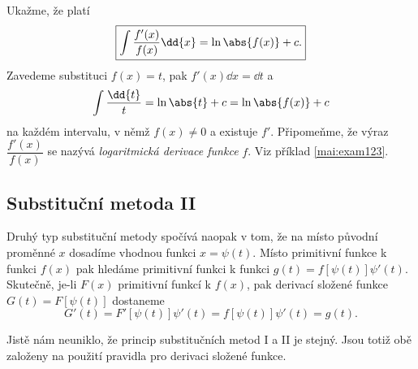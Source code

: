       

      

      

      

      Ukažme, že platí 
      \begin{equation}\label{mai:eq139}
        \boxed{\int{\dfrac{f'(x)}{f(x)}}\dd{x} = \ln\abs{f(x)} + c.}
      \end{equation}
      Zavedeme substituci \(f(x) =t\), pak \(f'(x)\dd{x} = \dd{t}\) a 
      \begin{equation*}
        \int{\dfrac{\dd{t}}{t}} = \ln\abs{t} + c = \ln\abs{f(x)} + c
      \end{equation*}
      na každém intervalu, v němž \(f(x)\neq 0\) a existuje \(f'\). Připomeňme, že výraz
      \(\dfrac{f'(x)}{f(x)}\) se nazývá \emph{logaritmická derivace funkce} \(f\). Viz příklad
      \ref{mai:exam123}.
   

    \newpage
    \subsection{Substituční metoda II}
      Druhý typ substituční metody spočívá naopak v tom, že na místo původní proměnné \(x\) 
      dosadíme vhodnou funkci \(x = \psi(t)\). Místo primitivní funkce k funkci \(f(x)\) pak 
      hledáme primitivní funkci k funkci \(g(t) = f[\psi(t)]\psi'(t)\). Skutečně, je-li \(F(x)\) 
      primitivní funkcí k \(f(x)\), pak derivací složené funkce \(G(t) = F[\psi(t)]\) dostaneme
      \begin{equation*}
       G'(t) = F'[\psi(t)]\psi'(t) = f[\psi(t)]\psi'(t) = g(t).
      \end{equation*}

      

      Jistě nám neuniklo, že princip substitučních metod I a II je stejný. Jsou totiž obě založeny 
      na použití pravidla pro derivaci složené funkce.
  

